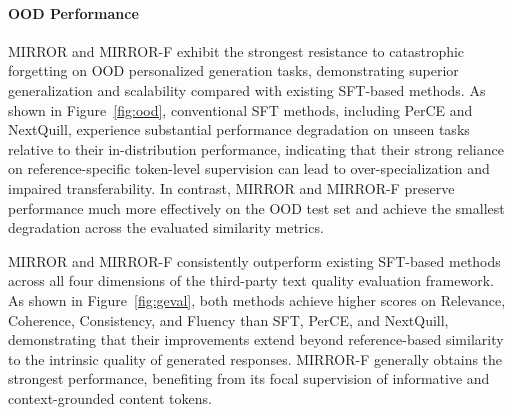 \documentclass{article} %
\begin{document}
\paragraph{OOD Performance} MIRROR and MIRROR-F exhibit the strongest resistance to catastrophic forgetting on OOD personalized generation tasks, demonstrating superior generalization and scalability compared with existing SFT-based methods. As shown in Figure~\ref{fig:ood}, conventional SFT methods, including PerCE and NextQuill, experience substantial performance degradation on unseen tasks relative to their in-distribution performance, indicating that their strong reliance on reference-specific token-level supervision can lead to over-specialization and impaired transferability. In contrast, MIRROR and MIRROR-F preserve performance much more effectively on the OOD test set and achieve the smallest degradation across the evaluated similarity metrics.




MIRROR and MIRROR-F consistently outperform existing SFT-based methods across all four dimensions of the third-party text quality evaluation framework. As shown in Figure~\ref{fig:geval}, both methods achieve higher scores on Relevance, Coherence, Consistency, and Fluency than SFT, PerCE, and NextQuill, demonstrating that their improvements extend beyond reference-based similarity to the intrinsic quality of generated responses. MIRROR-F generally obtains the strongest performance, benefiting from its focal supervision of informative and context-grounded content tokens.
\end{document}
